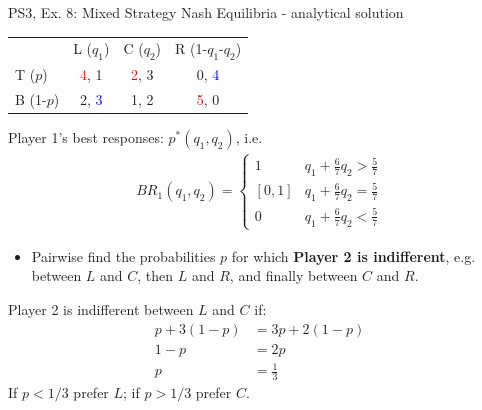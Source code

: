 \begin{frame}{PS3, Ex. 8: Mixed Strategy Nash Equilibria - analytical solution}
  \begin{multicols}{2}
    \begin{table}
      \begin{tabular}{l|c|c|c|}
          \multicolumn{1}{c}{}  & \multicolumn{1}{c}{L ($q_1$)} & \multicolumn{1}{c}{C ($q_2$)} & \multicolumn{1}{c}{R (1-$q_1$-$q_2$)} \\\cline{2-4}
          T ($p$)   & \textcolor{red}{4}, 1 & \textcolor{red}{2}, 3 & 0, \textcolor{blue}{4} \\\cline{2-4}
          B (1-$p$) & 2, \textcolor{blue}{3} & 1, 2 & \textcolor{red}{5}, 0 \\\cline{2-4}
      \end{tabular}
    \end{table}
    Player 1's best responses: $p^{*}(q_1,q_2)$, i.e.
    \begin{align*}
      BR_1(q_1,q_2)=\left\{ \begin{array}{ll}
          1                 & q_1 + \frac{6}{7}q_2 > \frac{5}{7}\\
          \left[0,1\right]  & q_1 + \frac{6}{7}q_2 = \frac{5}{7}\\
          0                 & q_1 + \frac{6}{7}q_2 < \frac{5}{7}
      \end{array}\right.
    \end{align*}
    \begin{itemize}
      \item[4.] Pairwise find the probabilities $p$ for which \textbf{Player 2 is indifferent}, e.g. between $L$ and $C$, then $L$ and $R$, and finally between $C$ and $R$.
    \end{itemize}
  \vfill\null \columnbreak
    Player 2 is indifferent between $L$ and $C$ if:
    \begin{align*}
      p+3(1-p)&= 3p + 2(1-p) \\
      1-p     &= 2p \\
      p       &= \frac{1}{3}
    \end{align*}
    If $p<1/3$ prefer $L$; if $p>1/3$ prefer $C$.\\\medskip
  \vfill\null
  \end{multicols}
\end{frame}
